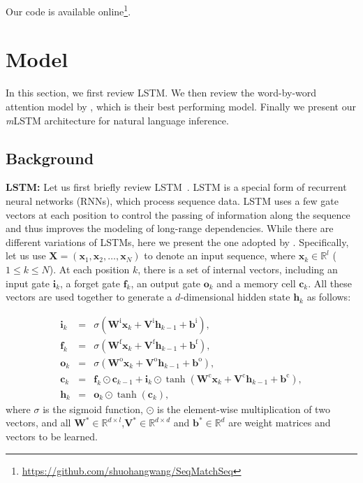 \documentclass[11pt,letterpaper]{article}
\begin{document}
Our code is available online\footnote{\url{https://github.com/shuohangwang/SeqMatchSeq}}. 
 \section{Model}

In this section, we first review LSTM.
We then review the word-by-word attention model by , which is their best performing model.
Finally we present our \emph{m}LSTM architecture for natural language inference.

\subsection{Background}

\noindent \textbf{LSTM:} Let us first briefly review LSTM~\cite{hochreiter:nc97}.
LSTM is a special form of recurrent neural networks (RNNs), which process sequence data.
LSTM uses a few gate vectors at each position to control the passing of information along the sequence and thus improves the modeling of long-range dependencies.
While there are different variations of LSTMs, here we present the one adopted by .
Specifically, let us use $\mathbf{X} = (\mathbf{x}_1, \mathbf{x}_2, \ldots, \mathbf{x}_N)$ to denote an input sequence, where  $\mathbf{x}_k \in \mathbb{R}^l$ ($1 \leq k \leq N$).
At each position $k$, there is a set of internal vectors, including an input gate $\mathbf{i}_k$, a forget gate $\mathbf{f}_k$, an output gate $\mathbf{o}_k$ and a memory cell $\mathbf{c}_k$.
All these vectors are used together to generate a $d$-dimensional hidden state $\mathbf{h}_k$ as follows:

\small
\begin{eqnarray}
\mathbf{i}_k & = & \sigma(\mathbf{W}^\text{i} \mathbf{x}_k + \mathbf{V}^\text{i} \mathbf{h}_{k-1} + \mathbf{b}^\text{i}), \nonumber \\
\mathbf{f}_k & = & \sigma(\mathbf{W}^\text{f} \mathbf{x}_k + \mathbf{V}^\text{f} \mathbf{h}_{k-1} + \mathbf{b}^\text{f}), \nonumber \\
\mathbf{o}_k & = & \sigma(\mathbf{W}^\text{o} \mathbf{x}_k + \mathbf{V}^\text{o} \mathbf{h}_{k-1} + \mathbf{b}^\text{o}), \nonumber \\
\mathbf{c}_k & = & \mathbf{f}_k \odot \mathbf{c}_{k-1} + \mathbf{i}_k \odot \tanh(\mathbf{W}^\text{c} \mathbf{x}_k + \mathbf{V}^\text{c} \mathbf{h}_{k-1} + \mathbf{b}^\text{c}), \nonumber \\
\mathbf{h}_k & = & \mathbf{o}_k \odot \tanh(\mathbf{c}_k),
\end{eqnarray}
\normalsize
where $\sigma$ is the sigmoid function, $\odot$ is the element-wise multiplication of two vectors, and all $\mathbf{W}^\text{*} \in \mathbb{R}^{d \times l}$,$\mathbf{V}^\text{*} \in \mathbb{R}^{d \times d}$ and $\mathbf{b}^\text{*} \in \mathbb{R}^d$ are weight matrices and vectors to be learned.
\end{document}
